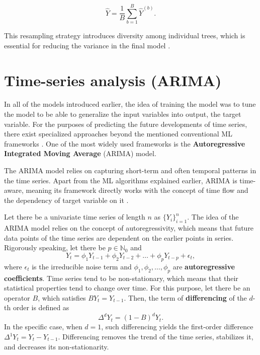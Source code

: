 \begin{equation*}
    \hat{Y} = \frac{1}{B}\sum_{b=1}^{B} \hat{Y}^{(b)}.
\end{equation*}

This resampling strategy introduces diversity among individual trees, which is essential for reducing the variance in the final model \cite{islp, skiena}.

\section{Time-series analysis (ARIMA)}
\label{sub:arima}

In all of the models introduced earlier, the idea of training the model was to tune the model to
be able to generalize the input variables into output, the target variable. For the purposes of predicting 
the future developments of time series, there exist specialized approaches beyond the mentioned conventional ML
frameworks \cite{forecast_book}. One of the most widely used frameworks is the \textbf{Autoregressive Integrated Moving Average} (ARIMA) model.

The ARIMA model relies on capturing short-term and often temporal patterns in the time series. Apart from the ML algorithms explained earlier, 
ARIMA is time-aware, meaning its framework directly works with the concept of time flow and the dependency of target variable on it \cite{forecast_book}. 

Let there be a univariate time series of length $n$ as $\{Y_i\}_{i=1}^{n}$. The idea of the ARIMA model relies on the concept of autoregressivity, which means
that future data points of the time series are dependent on the earlier points in series. Rigorously speaking, let there be $p \in \mathbb{N}_0$ and
\begin{equation}
    \label{eq:ARIMA1}
    Y_t = \phi_1 Y_{t-1} + \phi_2 Y_{t-2} + \ldots + \phi_{p} Y_{t-p} + \epsilon_t,
\end{equation}
where $\epsilon_t$ is the irreducible noise term and $\phi_1, \phi_2, \ldots, \phi_p$ are \textbf{autoregressive coefficients}. Time series tend to be non-stationary, which means that their statistical properties tend 
to change over time. For this purpose, let there be an operator $B$, which satisfies $B Y_t = Y_{t-1}$. Then, the term of \textbf{differencing} of the $d$-th order is defined as
\begin{equation}
    \label{eq:ARIMA2}
    \Delta^d Y_t=(1-B)^d Y_t.
\end{equation}
In the specific case, when $d = 1$, such differencing yields the first-order difference $\Delta^1Y_t=Y_t-Y_{t-1}$.
Differencing removes the trend of the time series, stabilizes it, and decreases its non-stationarity.

